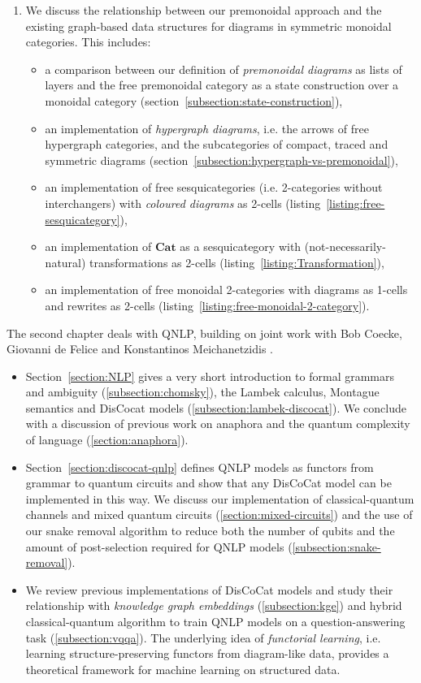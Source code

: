 \begin{enumerate}
\item We discuss the relationship between our premonoidal approach and the existing graph-based data structures for diagrams in symmetric monoidal categories.
This includes:
\begin{itemize}
\item a comparison between our definition of \emph{premonoidal diagrams} as lists of layers and the free premonoidal category as a state construction over a monoidal category (section~\ref{subsection:state-construction}),
\item an implementation of \emph{hypergraph diagrams}, i.e. the arrows of free hypergraph categories, and the subcategories of compact, traced and symmetric diagrams (section~\ref{subsection:hypergraph-vs-premonoidal}),
\item an implementation of free sesquicategories (i.e. 2-categories without interchangers) with \emph{coloured diagrams} as 2-cells (listing~\ref{listing:free-sesquicategory}),
\item an implementation of $\mathbf{Cat}$ as a sesquicategory with (not-necessarily-natural) transformations as 2-cells (listing~\ref{listing:Transformation}),
\item an implementation of free monoidal 2-categories with diagrams as 1-cells and rewrites as 2-cells (listing~\ref{listing:free-monoidal-2-category}).
\end{itemize}
\end{enumerate}
The second chapter deals with QNLP, building on joint work with Bob Coecke, Giovanni de Felice and Konstantinos Meichanetzidis \cite{MeichanetzidisEtAl20,CoeckeEtAl20,MeichanetzidisEtAl20a}.
\begin{itemize}
\item Section~\ref{section:NLP} gives a very short introduction to formal grammars and ambiguity (\ref{subsection:chomsky}), the Lambek calculus, Montague semantics and DisCocat models (\ref{subsection:lambek-discocat}).
We conclude with a discussion of previous work on anaphora and the quantum complexity of language (\ref{section:anaphora}).
\item Section~\ref{section:discocat-qnlp} defines QNLP models as functors from grammar to quantum circuits and show that any DisCoCat model can be implemented in this way.
We discuss our implementation of classical-quantum channels and mixed quantum circuits (\ref{section:mixed-circuits}) and the use of our snake removal algorithm to reduce both the number of qubits and the amount of post-selection required for QNLP models (\ref{subsection:snake-removal}).
\item We review previous implementations of DisCoCat models and study their relationship with \emph{knowledge graph embeddings} (\ref{subsection:kge}) and  hybrid classical-quantum algorithm to train QNLP models on a question-answering task (\ref{subsection:vqqa}).
The underlying idea of \emph{functorial learning}, i.e. learning structure-preserving functors from diagram-like data, provides a theoretical framework for machine learning on structured data.
\end{itemize}
